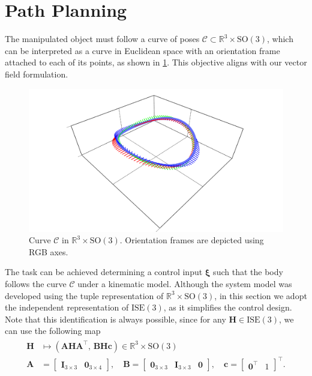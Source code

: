 \section{Path Planning}
The manipulated object must follow a curve of poses $\mathcal{C}\subset \mathbb{R}^3\times\text{SO}(3)$, which can be interpreted as a curve in Euclidean space with an orientation frame attached to each of its points, as shown in \cref{fig:curvewithframes}. This objective aligns with our vector field formulation.
\begin{figure}[ht]
    \centering
    \includegraphics[width=.8\linewidth]{figures/curve_with_frames.pdf}
    \caption{Curve $\mathcal{C}$ in $\mathbb{R}^3\times\text{SO}(3)$. Orientation frames are depicted using RGB axes.}
    \label{fig:curvewithframes}
\end{figure}

The task can be achieved determining a control input $\boldsymbol{\xi}$ such that the body follows the curve $\mathcal{C}$ under a kinematic model. Although the system model was developed using the tuple representation of $\mathbb{R}^3\times\text{SO}(3)$, in this section we adopt the independent representation of $\text{ISE}(3)$, as it simplifies the control design. Note that this identification is always possible, since for any $\mathbf{H}\in\text{ISE}(3)$, we can use the following map
\begin{align}
    \begin{split}
        \mathbf{H} &\mapsto (\mathbf{A}\mathbf{H}\mathbf{A}^\top,\, \mathbf{B}\mathbf{H}\mathbf{c}) \in \mathbb{R}^3\times\text{SO}(3)\\
        \mathbf{A} &= \begin{bmatrix}
            \mathbf{I}_{3\times 3} & \mathbf{0}_{3\times 4}
        \end{bmatrix}, \quad
        \mathbf{B} = \begin{bmatrix}
            \mathbf{0}_{3\times 3} & \mathbf{I}_{3\times 3} & \mathbf{0}
        \end{bmatrix}, \quad
        \mathbf{c} = \begin{bmatrix}
            \mathbf{0}^\top & 1
        \end{bmatrix}^\top.
    \end{split}
\end{align}

